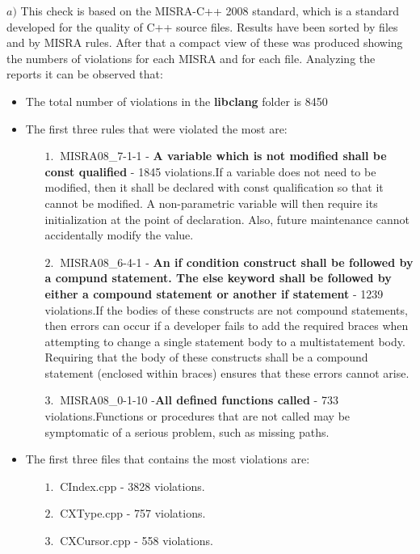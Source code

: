 \hspace{-0.6cm} \textbf{$a)$}  
This check is based on the MISRA-C++ 2008 standard, which is a standard developed for the quality of C++ source files.\newline
Results have been sorted by files and by MISRA rules. After that a compact view of these was produced showing the numbers of violations for each MISRA and for each file.\newline
Analyzing the reports it can be observed that:
\begin{itemize}
	\item The total number of violations in the \textbf{libclang} folder is 8450
	\item The first three rules that were violated the most are:
	\begin{itemize}
		\item[$1.\:$] MISRA08\_7-1-1 - \textbf{A variable which is not modified shall be const qualified} - 1845 violations.\newline If a variable does not need to be modified, then it shall be declared with const qualification so that it cannot be modified. A non-parametric variable will then require its initialization at the point of declaration. Also, future maintenance cannot accidentally modify the value.
		\item[$2.\:$] MISRA08\_6-4-1 - \textbf{An if condition construct shall be followed by a compund statement. The else keyword shall be followed by either a compound statement or another if statement} - 1239 violations.\newline If the bodies of these constructs are not compound statements, then errors can occur if a developer fails to add the required braces when attempting to change a single statement body to a multistatement body.
		Requiring that the body of these constructs shall be a compound statement (enclosed within braces) ensures that these errors cannot arise.
		\item[$3.\:$] MISRA08\_0-1-10 -\textbf{All defined functions called} - 733 violations.\newline Functions or procedures that are not called may be symptomatic of a serious problem, such as missing paths.
	\end{itemize}
	\item The first three files that contains the most violations are:
		\begin{itemize}
		\item[$1.\:$] CIndex.cpp - 3828 violations.
		\item[$2.\:$] CXType.cpp - 757 violations.
		\item[$3.\:$] CXCursor.cpp - 558 violations.
	\end{itemize}
\end{itemize}

